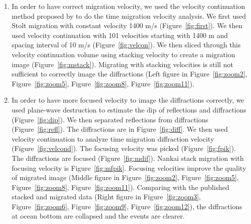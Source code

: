 \begin{enumerate}

\item In order to have correct migration velocity, we used the velocity continuation method proposed by \cite[]{VCZO} to do the time migration velocity analysis. We first used Stolt migration with constant velocity 1400 m/s (Figure~\ref{fig:first}). We then used velocity continuation with 101 velocities starting with 1400 m and spacing interval of 10 m/s (Figure~\ref{fig:velcon}). We then sliced through this velocity continuation volume using stacking velocity to create a migration image (Figure~\ref{fig:mstack}). Migrating with stacking velocities is still not sufficient to correctly image the diffractions (Left figure in Figure~\ref{fig:zoom2}, Figure~\ref{fig:zoom5}, Figure~\ref{fig:zoom8}, Figure~\ref{fig:zoom11}).  

\item In order to have more focused velocity to image the diffractions correctly, we used plane-wave destruction \cite[]{PWD} to estimate the dip of reflections and diffractions (Figure~\ref{fig:dip}). We then separated reflections from diffractions (Figure~\ref{fig:refl}). The diffractions are in Figure~\ref{fig:diff}. We then used velocity continuation to analyze time migration diffraction velocity (Figure~\ref{fig:velcond}). The focusing velocity was picked (Figure~\ref{fig:fpik}). The diffractions are focused (Figure~\ref{fig:mdif}). Nankai stack migration with focusing velocity is Figure~\ref{fig:mfpik}. Focusing velocities improve the quality of migrated image (Middle figure in Figure~\ref{fig:zoom2}, Figure~\ref{fig:zoom5}, Figure~\ref{fig:zoom8}, Figure~\ref{fig:zoom11}). Comparing with the published stacked and migrated data (Right figure in Figure~\ref{fig:zoom3}, Figure~\ref{fig:zoom6}, Figure~\ref{fig:zoom9}, Figure~\ref{fig:zoom12}), the diffractions at ocean bottom are collapsed and the events are clearer.       


\end{enumerate}\clearpage

